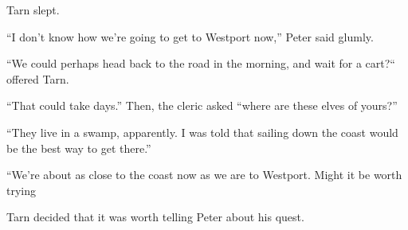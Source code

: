 Tarn slept.


``I don't know how we're going to get to Westport now,'' Peter said glumly.

``We could perhaps head back to the road in the morning, and wait for a cart?`` offered Tarn.

``That could take days.''  Then, the cleric asked ``where are these elves of yours?''

``They live in a swamp, apparently.  I was told that sailing down the coast would be the best way to get there.''

``We're about as close to the coast now as we are to Westport.  Might it be worth trying 

Tarn decided that it was worth telling Peter about his quest.